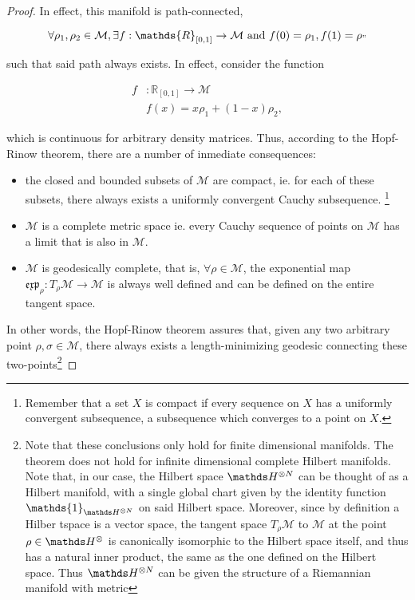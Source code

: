 \documentclass{homework}
\begin{document}
\begin{proof}
    
In effect, this manifold is path-connected,

$$
    \forall \rho_1, \rho_2 \in \mathcal{M}, \exists f:\mathds{R}_{[0,1]} \rightarrow \mathcal{M} \textnormal{ and } f(0) = \rho_1, f(1) = \rho_"
$$

such that said path always exists. In effect, consider the function 

\begin{align*}
    f&:\mathds{R}_{[0,1]} \rightarrow \mathcal{M} \\
    &f(x) = x \rho_1 + (1-x) \rho_2,
\end{align*}

which is continuous for arbitrary density matrices. Thus, according to the Hopf-Rinow theorem, there are a number of inmediate consequences:

\begin{itemize}
    \item the closed and bounded subsets of $\mathcal{M}$ are compact, ie. for each of these subsets, there always exists a uniformly convergent Cauchy subsequence. \footnote{Remember that a set $X$ is compact if every sequence on $X$ has a uniformly convergent subsequence, a subsequence which converges to a point on $X$.}
    \item $\mathcal{M}$ is a complete metric space ie. every Cauchy sequence of points on $\mathcal{M}$ has a limit that is also in $\mathcal{M}$.
    \item $\mathcal{M}$ is geodesically complete, that is, $\forall \rho \in \mathcal{M}$, the exponential map $\mathfrak{e}\mathfrak{x}\mathfrak{p}_{\rho}: T_{\rho} \mathcal{M} \rightarrow \mathcal{M}$ is always well defined and can be defined on the entire tangent space. 
\end{itemize}

In other words, the Hopf-Rinow theorem assures that, given any two arbitrary point $\rho, \sigma \in \mathcal{M}$, there always exists a length-minimizing geodesic connecting these two-points\footnote{Note that these conclusions only hold for finite dimensional manifolds. The theorem does not hold for infinite dimensional complete Hilbert manifolds. Note that, in our case, the Hilbert space $\hilbert^{\otimes N}$ can be thought of as a Hilbert manifold, with a single global chart given by the identity function $\mathds{1}_{\hilbert^{\otimes N}}$ on said Hilbert space. Moreover, since by definition a Hilber tspace is a vector space, the tangent space $T_{\rho} \mathcal{M}$ to $\mathcal{M}$ at the point $\rho \in \hilbert^{\otimes}$ is canonically isomorphic to the Hilbert space itself, and thus has a natural inner product, the same as the one defined on the Hilbert space. Thus $\hilbert^{\otimes N}$ can be given the structure of a Riemannian manifold with metric 

}
\end{proof}
\end{document}
